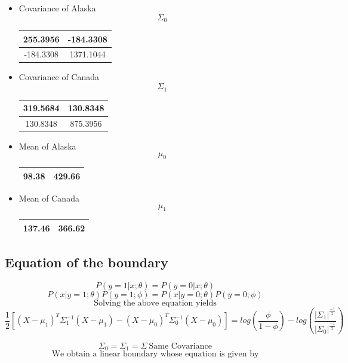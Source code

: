 \documentclass[10pt]{article}
\begin{document}
\begin{itemize}
\item Covariance of Alaska \[\Sigma_0\] \begin{center}
\begin{tabular}{ |c|c|}
\hline
 255.3956 & -184.3308  \\
 \hline 
 -184.3308 & 1371.1044 \\
\hline       
\end{tabular}
\end{center}
\item Covariance of Canada \[\Sigma_1\] \begin{center}
\begin{tabular}{ |c|c|}
\hline
 319.5684 & 130.8348  \\
 \hline 
 130.8348 & 875.3956 \\
\hline       
\end{tabular}
\end{center}
\item Mean of Alaska $$\mu_0$$ \begin{center}
\begin{tabular}{ |c|c|}
\hline
 98.38 & 429.66  \\
 \hline        
\end{tabular}
\end{center}
\item Mean of Canada $$\mu_1$$ \begin{center}
\begin{tabular}{ |c|c|}
\hline
 137.46 & 366.62  \\
\hline       
\end{tabular}
\end{center}
\end{itemize}

\subsection{Equation of the boundary}

$$P(y=1| x;\theta) = P(y=0|x;\theta)$$
$$P(x|y=1;\theta)P(y=1;\phi) = P(x|y=0;\theta)P(y=0;\phi)$$
$$\text{Solving the above equation yields}$$
$$\frac{1}{2}[(X-\mu_1)^T\Sigma_1^{-1}(X-\mu_1) - (X-\mu_0)^T\Sigma_0^{-1}(X-\mu_0)] = log(\frac{\phi}{1-\phi}) - log(\frac{|\Sigma_1|^{\frac{-1}{2}}}{|\Sigma_0|^{\frac{-1}{2}}})$$

$$\Sigma_0 = \Sigma_1 = \Sigma \ \text{Same Covariance}$$
$$\text{We obtain a linear boundary whose equation is given by}$$
\end{document}
